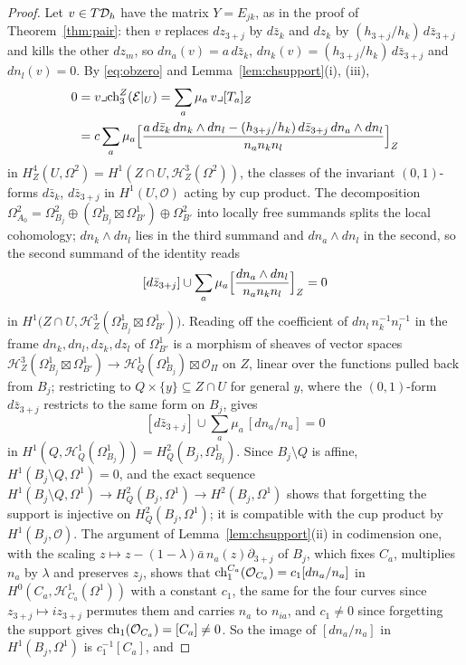 \begin{proof}
Let $v\in T\mathcal{D}_{h}$ have the matrix $Y=E_{jk}$, as in the proof of Theorem~\ref{thm:pair}: then $v$ replaces $dz_{3+j}$ by $d\bar z_{k}$ and $dz_{k}$ by $(h_{3+j}/h_{k})\,d\bar z_{3+j}$ and kills the other $dz_{m}$, so $dn_{a}(v)=a\,d\bar z_{k}$, $dn_{k}(v)=(h_{3+j}/h_{k})\,d\bar z_{3+j}$ and $dn_{l}(v)=0$. By \eqref{eq:obzero} and Lemma~\ref{lem:chsupport}(i), (iii),
\begin{align*}
0&=v\lrcorner\mathrm{ch}^{Z}_{3}(\mathcal{E}|_{U})=\sum_{a}\mu_{a}\,v\lrcorner[T_{a}]_{Z}\\
&=c\sum_{a}\mu_{a}\Bigl[\frac{a\,d\bar z_{k}\,dn_{k}\wedge dn_{l}-(h_{3+j}/h_{k})\,d\bar z_{3+j}\,dn_{a}\wedge dn_{l}}{n_{a}n_{k}n_{l}}\Bigr]_{Z}
\end{align*}
in $H^{4}_{Z}(U,\Omega^{2})=H^{1}(Z\cap U,\mathcal{H}^{3}_{Z}(\Omega^{2}))$, the classes of the invariant $(0,1)$-forms $d\bar z_{k}$, $d\bar z_{3+j}$ in $H^{1}(U,\mathcal{O})$ acting by cup product. The decomposition $\Omega^{2}_{A_{0}}=\Omega^{2}_{B_{j}}\oplus(\Omega^{1}_{B_{j}}\boxtimes\Omega^{1}_{B'})\oplus\Omega^{2}_{B'}$ into locally free summands splits the local cohomology; $dn_{k}\wedge dn_{l}$ lies in the third summand and $dn_{a}\wedge dn_{l}$ in the second, so the second summand of the identity reads
\[
[d\bar z_{3+j}]\cup\sum_{a}\mu_{a}\Bigl[\frac{dn_{a}\wedge dn_{l}}{n_{a}n_{k}n_{l}}\Bigr]_{Z}=0
\]
in $H^{1}\bigl(Z\cap U,\mathcal{H}^{3}_{Z}(\Omega^{1}_{B_{j}}\boxtimes\Omega^{1}_{B'})\bigr)$.
Reading off the coefficient of $dn_{l}\,n_{k}^{-1}n_{l}^{-1}$ in the frame $dn_{k},dn_{l},dz_{k},dz_{l}$ of $\Omega^{1}_{B'}$ is a morphism of sheaves of vector spaces $\mathcal{H}^{3}_{Z}(\Omega^{1}_{B_{j}}\boxtimes\Omega^{1}_{B'})\to\mathcal{H}^{1}_{Q}(\Omega^{1}_{B_{j}})\boxtimes\mathcal{O}_{\Pi}$ on $Z$, linear over the functions pulled back from $B_{j}$; restricting to $Q\times\{y\}\subseteq Z\cap U$ for general $y$, where the $(0,1)$-form $d\bar z_{3+j}$ restricts to the same form on $B_{j}$, gives
\[
[d\bar z_{3+j}]\cup\sum_{a}\mu_{a}\,[dn_{a}/n_{a}]=0
\]
in $H^{1}(Q,\mathcal{H}^{1}_{Q}(\Omega^{1}_{B_{j}}))=H^{2}_{Q}(B_{j},\Omega^{1}_{B_{j}})$.
Since $B_{j}\setminus Q$ is affine, $H^{1}(B_{j}\setminus Q,\Omega^{1})=0$, and the exact sequence $H^{1}(B_{j}\setminus Q,\Omega^{1})\to H^{2}_{Q}(B_{j},\Omega^{1})\to H^{2}(B_{j},\Omega^{1})$ shows that forgetting the support is injective on $H^{2}_{Q}(B_{j},\Omega^{1})$; it is compatible with the cup product by $H^{1}(B_{j},\mathcal{O})$. The argument of Lemma~\ref{lem:chsupport}(ii) in codimension one, with the scaling $z\mapsto z-(1-\lambda)\bar a\,n_{a}(z)\partial_{3+j}$ of $B_{j}$, which fixes $C_{a}$, multiplies $n_{a}$ by $\lambda$ and preserves $z_{j}$, shows that $\mathrm{ch}^{C_{a}}_{1}(\mathcal{O}_{C_{a}})=c_{1}[dn_{a}/n_{a}]$ in $H^{0}(C_{a},\mathcal{H}^{1}_{C_{a}}(\Omega^{1}))$ with a constant $c_{1}$, the same for the four curves since $z_{3+j}\mapsto iz_{3+j}$ permutes them and carries $n_{a}$ to $n_{ia}$, and $c_{1}\ne0$ since forgetting the support gives $\mathrm{ch}_{1}(\mathcal{O}_{C_{a}})=[C_{a}]\ne0$. So the image of $[dn_{a}/n_{a}]$ in $H^{1}(B_{j},\Omega^{1})$ is $c_{1}^{-1}[C_{a}]$, and

\end{proof}
